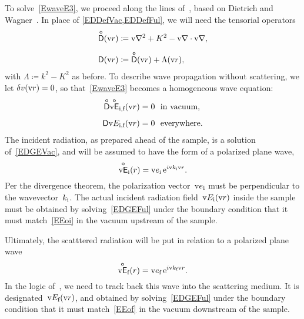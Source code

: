 \def\Ei{\v{E}_\si}
\def\Eic{\Ei^*}
\def\Ef{\v{E}_\sf}
\def\Efc{\Ef^*}
\def\Eo{\TENS{\overset{o}{\v{E}}}}
\def\Efo{\Eo_\sf}
\def\Efoc{\Eo\vphantom{E}^*_\sf}
\def\he{\v{\hat e}}
\def\hef{\he_\sf}
\def\hei{\he_\si}
\def\sif{\text{i,f}}

To solve~\cref{EwaveE3}, we proceed along the lines of~,
based on Dietrich and Wagner~\cite{DiWa84}.
In place of \cref{EDDefVac,EDDefFul}, we will need the tensorial operators
\begin{align}
    \mathsf{\overset{o}{D}}(\text{v}{r}) &\coloneqq \text{v}{\nabla}^2+K^2-\text{v}{\nabla}\cdot\text{v}{\nabla}, \\[1.2ex]
    \mathsf{D}(\text{v}{r})  &\coloneqq \mathsf{\overset{o}{D}}(\text{v}{r}) + \Lambda(\text{v}{r}),
\end{align}
with $\Lambda\coloneqq k^2-K^2$ as before.
To describe wave propagation without scattering,
we let $\delta v(\text{v}{r})=0$,
so that~\cref{EwaveE3} becomes a homogeneous wave equation:
\begin{align}
    \TDo\Eo_\sif  (\r) = 0 &\text{\strut~~in vacuum,} \label{EDGEVac}\\[1.2ex]
    \TD\v{E}_\sif(\r) = 0 &\text{\strut~~everywhere}. \label{EDGEFul}
\end{align}
The incident radiation, as prepared ahead of the sample, is a solution of~\cref{EDGEVac},
and will be assumed to have the form of a polarized plane wave,
\begin{equation}\label{EEoi}
   \Eo_\si(r) = \v{e}_\si\, \e^{i\k_\si\r}.
\end{equation}
Per the divergence theorem,
the polarization vector~$\text{v}{e}_{\text{i}}$ must be perpendicular to the wavevector~$k_{\text{i}}$.
The actual incident radiation field~$\Ei(\r)$ inside the sample
must be obtained by solving~\cref{EDGEFul}
under the boundary condition that it must match~\cref{EEoi}
in the vacuum upstream of the sample.

Ultimately, the scatttered radiation will be put in relation to
a polarized plane wave
\begin{equation}\label{EEof}
   \Eo_\sf(r) = \v{e}_\sf\, \e^{i\k_\sf\r}.
\end{equation}
In the logic of~,
we need to track back this wave into the scattering medium.
It is designated~$\Ef(\r)$, and obtained by solving~\cref{EDGEFul} under
the boundary condition that it must match~\cref{EEof}
in the vacuum downstream of the sample.

